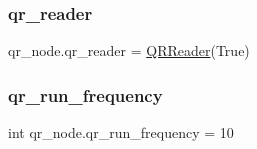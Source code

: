\subsubsection{\texorpdfstring{qr\+\_\+reader}{qr\_reader}}
{\footnotesize\ttfamily qr\+\_\+node.\+qr\+\_\+reader = \hyperlink{classqr__node_1_1QRReader}{Q\+R\+Reader}(True)}

\mbox{\label{namespaceqr__node_a31e85e3f8f81a5242b77220f7d159f8f}} 
\subsubsection{\texorpdfstring{qr\+\_\+run\+\_\+frequency}{qr\_run\_frequency}}
{\footnotesize\ttfamily int qr\+\_\+node.\+qr\+\_\+run\+\_\+frequency = 10}

